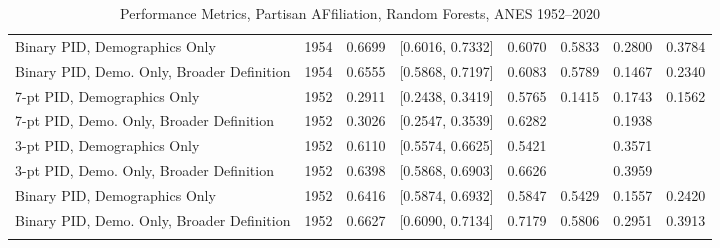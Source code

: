 \begin{longtable}{lrrlrrrr}
  Binary PID, Demographics Only & 1954 & 0.6699 & [0.6016, 0.7332] & 0.6070 & 0.5833 & 0.2800 & 0.3784 \\ 
  Binary PID, Demo. Only, Broader Definition & 1954 & 0.6555 & [0.5868, 0.7197] & 0.6083 & 0.5789 & 0.1467 & 0.2340 \\ 
  7-pt PID, Demographics Only & 1952 & 0.2911 & [0.2438, 0.3419] & 0.5765 & 0.1415 & 0.1743 & 0.1562 \\ 
  7-pt PID, Demo. Only, Broader Definition & 1952 & 0.3026 & [0.2547, 0.3539] & 0.6282 &  & 0.1938 &  \\ 
  3-pt PID, Demographics Only & 1952 & 0.6110 & [0.5574, 0.6625] & 0.5421 &  & 0.3571 &  \\ 
  3-pt PID, Demo. Only, Broader Definition & 1952 & 0.6398 & [0.5868, 0.6903] & 0.6626 &  & 0.3959 &  \\ 
  Binary PID, Demographics Only & 1952 & 0.6416 & [0.5874, 0.6932] & 0.5847 & 0.5429 & 0.1557 & 0.2420 \\ 
  Binary PID, Demo. Only, Broader Definition & 1952 & 0.6627 & [0.6090, 0.7134] & 0.7179 & 0.5806 & 0.2951 & 0.3913 \\ 
   \bottomrule
\caption{Performance Metrics, Partisan AFfiliation, Random Forests, ANES 1952--2020} 
\label{tab:ANES_pid_rf}
\end{longtable}
